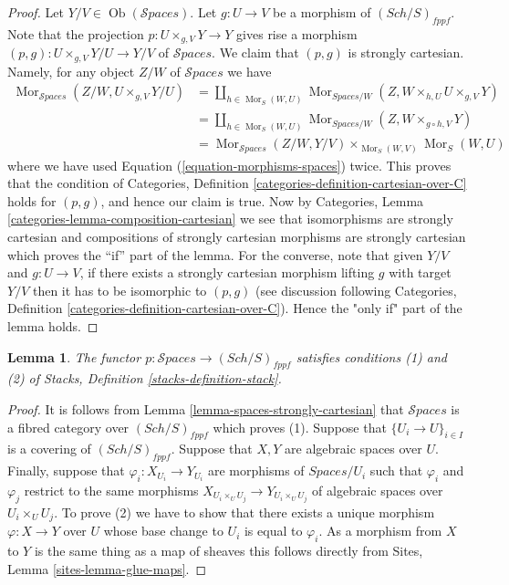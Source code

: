 \documentclass{stacks-project}
\theoremstyle{plain}
\newtheorem{lemma}[subsection]{Lemma}
\theoremstyle{definition}
\theoremstyle{remark}
\numberwithin{equation}{subsection}
\def\Sch{\mathit{Sch}}
\def\Mor{\mathop{\mathrm{Mor}}\nolimits}
\def\Ob{\mathop{\mathrm{Ob}}\nolimits}
\def\Spacesstack{\mathcal{S}\!\mathit{paces}}
\begin{document}
\begin{proof}
Let $Y/V \in \Ob(\Spacesstack)$.
Let $g : U \to V$ be a morphism of $(\Sch/S)_{fppf}$.
Note that the projection $p : U \times_{g, V} Y \to Y$
gives rise a morphism
$(p, g) : U \times_{g, V} Y/U \to Y/V$ of $\Spacesstack$.
We claim that $(p, g)$ is strongly cartesian.
Namely, for any object $Z/W$ of $\Spacesstack$ we have
\begin{align*}
\Mor_{\Spacesstack}(Z/W, U \times_{g, V} Y/U)
& =
\coprod\nolimits_{h \in \Mor_S(W, U)}
\Mor_{\textit{Spaces}/W}(Z, W \times_{h, U} U \times_{g, V} Y) \\
& =
\coprod\nolimits_{h \in \Mor_S(W, U)}
\Mor_{\textit{Spaces}/W}(Z, W \times_{g \circ h, V} Y) \\
& =
\Mor_{\Spacesstack}(Z/W, Y/V)
\times_{\Mor_S(W, V)} \Mor_S(W, U)
\end{align*}
where we have used Equation (\ref{equation-morphisms-spaces}) twice.
This proves that the condition of
Categories, Definition \ref{categories-definition-cartesian-over-C}
holds for $(p, g)$, and hence our claim is true. Now by
Categories, Lemma \ref{categories-lemma-composition-cartesian}
we see that isomorphisms are strongly cartesian and
compositions of strongly cartesian morphisms are strongly cartesian
which proves the ``if'' part of the lemma. For the converse, note
that given $Y/V$ and $g : U \to V$, if there exists a
strongly cartesian morphism lifting $g$ with target $Y/V$
then it has to be isomorphic to $(p, g)$ (see discussion following
Categories, Definition \ref{categories-definition-cartesian-over-C}).
Hence the "only if" part of the lemma holds.
\end{proof}

\begin{lemma}
\label{lemma-pre-stack-of-spaces}
The functor $p : \Spacesstack \to (\Sch/S)_{fppf}$
satisfies conditions (1) and (2) of
Stacks, Definition \ref{stacks-definition-stack}.
\end{lemma}

\begin{proof}
It is follows from
Lemma \ref{lemma-spaces-strongly-cartesian}
that $\Spacesstack$ is a fibred category over $(\Sch/S)_{fppf}$
which proves (1).
Suppose that $\{U_i \to U\}_{i \in I}$ is a covering of
$(\Sch/S)_{fppf}$. Suppose that $X, Y$ are algebraic spaces over
$U$. Finally, suppose that $\varphi_i : X_{U_i} \to Y_{U_i}$ are morphisms
of $\textit{Spaces}/U_i$ such that $\varphi_i$ and $\varphi_j$ restrict
to the same morphisms $X_{U_i \times_U U_j} \to Y_{U_i \times_U U_j}$
of algebraic spaces over $U_i \times_U U_j$.
To prove (2) we have to show that there exists a unique morphism
$\varphi  : X \to Y$ over $U$ whose base change to $U_i$ is
equal to $\varphi_i$. As a morphism from $X$ to $Y$ is the same thing
as a map of sheaves this follows directly from
Sites, Lemma \ref{sites-lemma-glue-maps}.
\end{proof}
\end{document}
